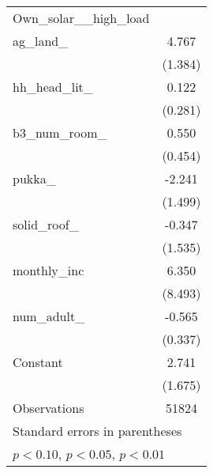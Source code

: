 {\begin{tabular}{l*{1}{c}}
\midrule
Own\_solar\_\_high\_load&                     \\
ag\_land\_            &       4.767\sym{***}\\
                    &     (1.384)         \\
\addlinespace
hh\_head\_lit\_        &       0.122         \\
                    &     (0.281)         \\
\addlinespace
b3\_num\_room\_        &       0.550         \\
                    &     (0.454)         \\
\addlinespace
pukka\_              &      -2.241         \\
                    &     (1.499)         \\
\addlinespace
solid\_roof\_         &      -0.347         \\
                    &     (1.535)         \\
\addlinespace
monthly\_inc         &       6.350         \\
                    &     (8.493)         \\
\addlinespace
num\_adult\_          &      -0.565\sym{*}  \\
                    &     (0.337)         \\
\addlinespace
Constant            &       2.741         \\
                    &     (1.675)         \\
\midrule
Observations        &       51824         \\
\bottomrule
\multicolumn{2}{l}{\footnotesize Standard errors in parentheses}\\
\multicolumn{2}{l}{\footnotesize \sym{*} \(p<0.10\), \sym{**} \(p<0.05\), \sym{***} \(p<0.01\)}\\
\end{tabular}
}
